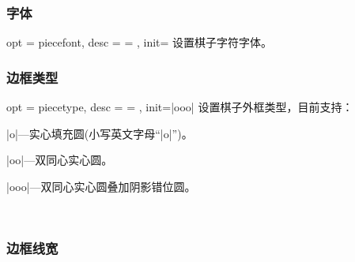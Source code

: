 \documentclass[full]{l3doc}
\begin{document}
\begin{documentation}
\bigskip

\resetpiece
{}

\subsubsection{字体}

\begin{option}{ opt = piecefont, desc = {= }, init= }
  设置棋子字符字体。
\end{option}

\begin{SideBySideExample}[frame=single,numbers=left,
                xrightmargin=.54\linewidth,gobble=2]
  \centering
  \cchessboard[piecefont=\sffamily]
\end{SideBySideExample}

\bigskip

\subsubsection{边框类型}

\begin{option}{ opt = piecetype, desc = {= }, init=|ooo| }
  设置棋子外框类型，目前支持：
\end{option}

  \begin{Description}[a]
    \item |o|---实心填充圆(小写英文字母``|o|'')。
    \item |oo|---双同心实心圆。
    \item |ooo|---双同心实心圆叠加阴影错位圆。
  \end{Description}

\begin{SideBySideExample}[frame=single,numbers=left,
                xrightmargin=.55\linewidth,gobble=2]
  \centering
  \cchessboard[piecetype=o]\quad
  \cchessboard[piecetype=oo]\\
  \cchessboard[piecetype=ooo]
\end{SideBySideExample}

\bigskip

\subsubsection{边框线宽}


\end{documentation}
\end{document}

